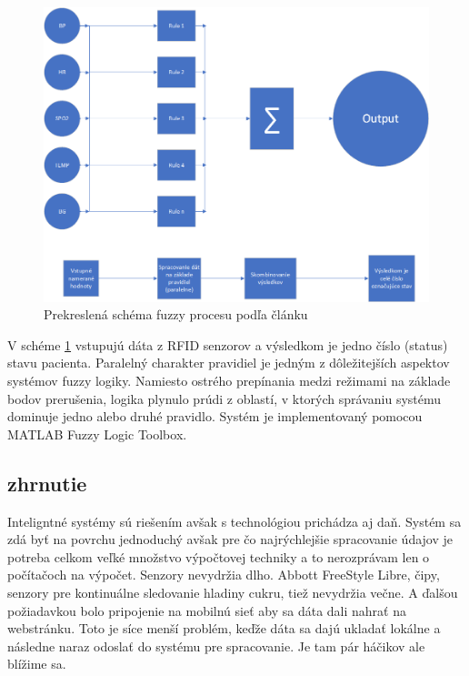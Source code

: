 \begin{figure}[H]
\centering
\includegraphics[scale=0.65]{rule-based-engine.png}
\caption{Prekreslená schéma fuzzy procesu podľa článku\cite{2019}}
\label{fuzzy}
\end{figure}

V schéme \ref{fuzzy} vstupujú dáta z RFID senzorov a výsledkom je jedno číslo (status) stavu pacienta. Paralelný charakter pravidiel je jedným z dôležitejších aspektov systémov fuzzy logiky. Namiesto ostrého prepínania medzi režimami na základe bodov prerušenia, logika plynulo prúdi z oblastí, v ktorých správaniu systému dominuje jedno alebo druhé pravidlo. Systém je implementovaný pomocou MATLAB Fuzzy Logic Toolbox. \cite{2019}

\subsection{zhrnutie}
Inteligntné systémy sú riešením avšak s technológiou prichádza aj daň. Systém sa zdá byť na povrchu jednoduchý avšak pre čo najrýchlejšie spracovanie údajov je potreba celkom veľké množstvo výpočtovej techniky a to nerozprávam len o počítačoch na výpočet. Senzory nevydržia dlho. Abbott FreeStyle Libre, čipy, senzory pre kontinuálne sledovanie hladiny cukru, tiež nevydržia večne. A ďalšou požiadavkou bolo pripojenie na mobilnú sieť aby sa dáta dali nahrať na webstránku. Toto je síce menší problém, keďže dáta sa dajú ukladať lokálne a následne naraz odoslať do systému pre spracovanie. Je tam pár háčikov ale blížime sa.